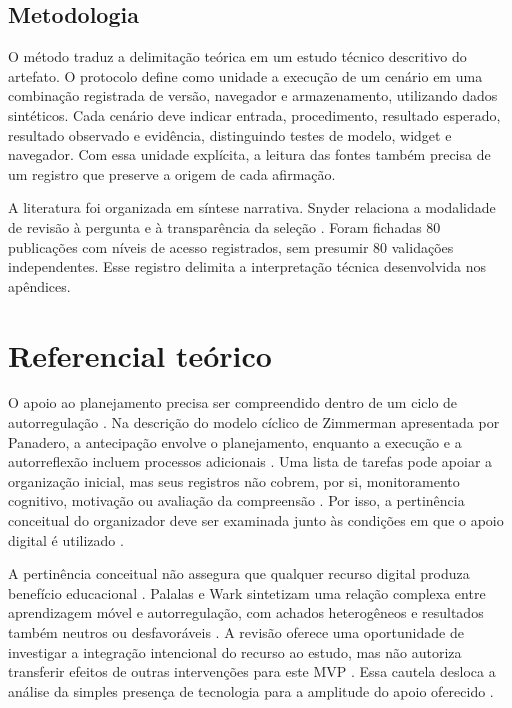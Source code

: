 \subsection{Metodologia}

O método traduz a delimitação teórica em um estudo técnico descritivo do artefato. O protocolo define como unidade a execução de um cenário em uma combinação registrada de versão, navegador e armazenamento, utilizando dados sintéticos. Cada cenário deve indicar entrada, procedimento, resultado esperado, resultado observado e evidência, distinguindo testes de modelo, widget e navegador. Com essa unidade explícita, a leitura das fontes também precisa de um registro que preserve a origem de cada afirmação.

A literatura foi organizada em síntese narrativa. Snyder relaciona a modalidade de revisão à pergunta e à transparência da seleção \citep[p. 336–337]{SU11}. Foram fichadas 80 publicações com níveis de acesso registrados, sem presumir 80 validações independentes. Esse registro delimita a interpretação técnica desenvolvida nos apêndices.

\clearpage\section{Referencial teórico}

O apoio ao planejamento precisa ser compreendido dentro de um ciclo de autorregulação \citep[p. 1, 3]{SU10}. Na descrição do modelo cíclico de Zimmerman apresentada por Panadero, a antecipação envolve o planejamento, enquanto a execução e a autorreflexão incluem processos adicionais \citep[p. 1, 3]{SU10}. Uma lista de tarefas pode apoiar a organização inicial, mas seus registros não cobrem, por si, monitoramento cognitivo, motivação ou avaliação da compreensão \citep[p. 1, 3]{SU10}. Por isso, a pertinência conceitual do organizador deve ser examinada junto às condições em que o apoio digital é utilizado \citep[p. 1, 3]{SU10}.

A pertinência conceitual não assegura que qualquer recurso digital produza benefício educacional \citep[p. 156, 164–165]{education_palalas2020}. Palalas e Wark sintetizam uma relação complexa entre aprendizagem móvel e autorregulação, com achados heterogêneos e resultados também neutros ou desfavoráveis \citep[p. 156, 164–165]{education_palalas2020}. A revisão oferece uma oportunidade de investigar a integração intencional do recurso ao estudo, mas não autoriza transferir efeitos de outras intervenções para este MVP \citep[p. 156, 164–165]{education_palalas2020}. Essa cautela desloca a análise da simples presença de tecnologia para a amplitude do apoio oferecido \citep[p. 156, 164–165]{education_palalas2020}.

